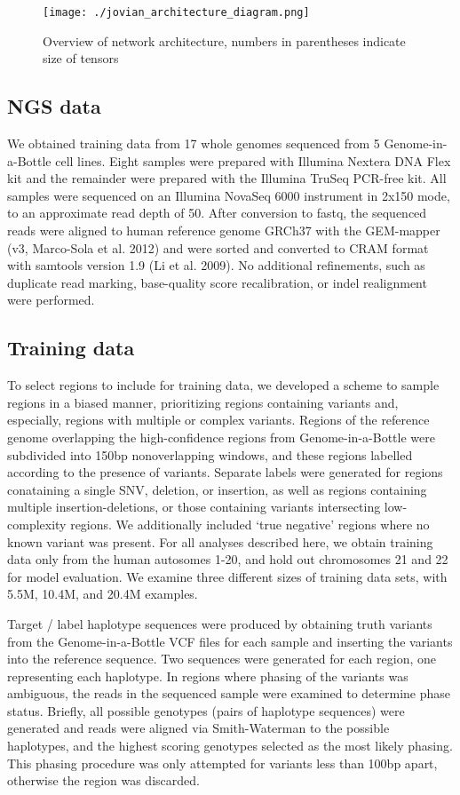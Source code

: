 \documentclass[]{article}
\begin{document}
\begin{figure}[htp]
	\texttt{[image: ./jovian\_architecture\_diagram.png]}
	\caption{ Overview of network architecture, numbers in parentheses indicate size of tensors  }
	\label{fig:architecture}
\end{figure}

\subsection{NGS data}

We obtained training data from 17 whole genomes sequenced from 5 Genome-in-a-Bottle cell lines. Eight samples were prepared with Illumina Nextera DNA Flex kit and the remainder were prepared with the Illumina TruSeq PCR-free kit. All samples were sequenced on an Illumina NovaSeq 6000 instrument in 2x150 mode, to an approximate read depth of 50. After conversion to fastq, the sequenced reads were aligned to human reference genome GRCh37 with the GEM-mapper (v3, Marco-Sola et al. 2012) and were sorted and converted to CRAM format with samtools version 1.9 (Li et al. 2009). No additional refinements, such as duplicate read marking, base-quality score recalibration, or indel realignment were performed.

\subsection{Training data}


To select regions to include for training data, we developed a scheme to sample regions in a biased manner, prioritizing regions containing variants and, especially, regions with multiple or complex variants. Regions of the reference genome overlapping the high-confidence regions from Genome-in-a-Bottle were subdivided into 150bp nonoverlapping windows, and these regions labelled according to the presence of variants. Separate labels were generated for regions conataining a single SNV, deletion, or insertion, as well as regions containing multiple insertion-deletions, or those containing variants intersecting low-complexity regions. We additionally included `true negative' regions where no known variant was present.  For all analyses described here, we obtain training data only from the human autosomes 1-20, and hold out chromosomes 21 and 22 for model evaluation.  We examine three different sizes of training data sets, with 5.5M, 10.4M, and 20.4M examples. 


Target / label haplotype sequences were produced by obtaining truth variants from the Genome-in-a-Bottle VCF files for each sample and inserting the variants into the reference sequence. Two sequences were generated for each region, one representing each haplotype. In regions where phasing of the variants was ambiguous, the reads in the sequenced sample were examined to determine phase status. Briefly, all possible genotypes (pairs of haplotype sequences) were generated and reads were aligned via Smith-Waterman to the possible haplotypes, and the highest scoring genotypes selected as the most likely phasing. This phasing procedure was only attempted for variants less than 100bp apart, otherwise the region was discarded.
\end{document}
